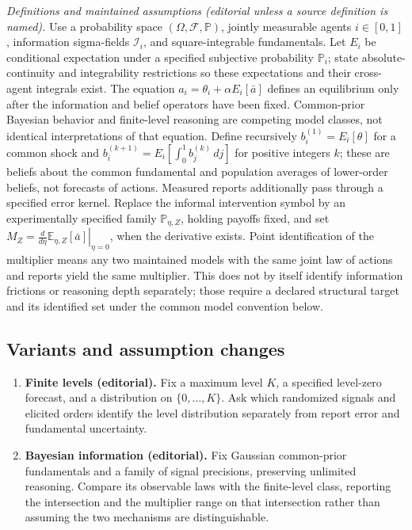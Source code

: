 \documentclass[11pt,a4paper]{article}
\begin{document}
\emph{Definitions and maintained assumptions (editorial unless a source definition is named).} Use a probability space \((\Omega,\mathcal F,\mathbb P)\), jointly measurable agents \(i\in[0,1]\), information sigma-fields \(\mathcal I_i\), and square-integrable fundamentals. Let \(E_i\) be conditional expectation under a specified subjective probability \(\mathbb P_i\); state absolute-continuity and integrability restrictions so these expectations and their cross-agent integrals exist. The equation \(a_i=\theta_i+\alpha E_i[\bar a]\) defines an equilibrium only after the information and belief operators have been fixed. Common-prior Bayesian behavior and finite-level reasoning are competing model classes, not identical interpretations of that equation. Define recursively \(b_i^{(1)}=E_i[\theta]\) for a common shock and \(b_i^{(k+1)}=E_i[\int_0^1 b_j^{(k)}\,dj]\) for positive integers \(k\); these are beliefs about the common fundamental and population averages of lower-order beliefs, not forecasts of actions. Measured reports additionally pass through a specified error kernel. Replace the informal intervention symbol by an experimentally specified family \(\mathbb P_{\eta,Z}\), holding payoffs fixed, and set \(M_Z=\left.\frac{d}{d\eta}\mathbb E_{\eta,Z}[\bar a]\right|_{\eta=0}\), when the derivative exists. Point identification of the multiplier means any two maintained models with the same joint law of actions and reports yield the same multiplier. This does not by itself identify information frictions or reasoning depth separately; those require a declared structural target and its identified set under the common model convention below.
\subsection*{Variants and assumption changes}
\begin{enumerate}
\item \textbf{Finite levels (editorial).} Fix a maximum level \(K\), a specified level-zero forecast, and a distribution on \(\{0,\ldots,K\}\). Ask which randomized signals and elicited orders identify the level distribution separately from report error and fundamental uncertainty.
\item \textbf{Bayesian information (editorial).} Fix Gaussian common-prior fundamentals and a family of signal precisions, preserving unlimited reasoning. Compare its observable laws with the finite-level class, reporting the intersection and the multiplier range on that intersection rather than assuming the two mechanisms are distinguishable.
\end{enumerate}
\end{document}
